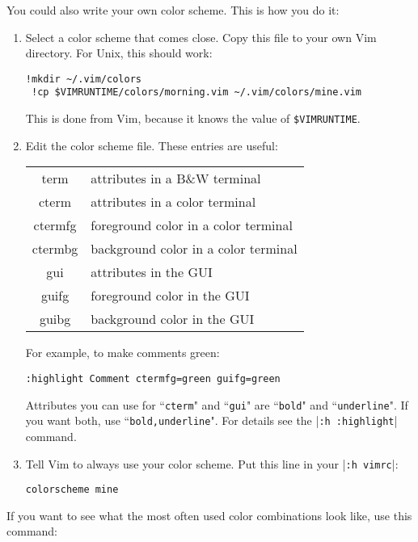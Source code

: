 You could also write your own color scheme.
This is how you do it:
\begin{enumerate}
				\item Select a color scheme that comes close.
								Copy this file to your own Vim directory.
								For Unix, this should work:

								\begin{Verbatim}[samepage=true]
 !mkdir ~/.vim/colors
 !cp $VIMRUNTIME/colors/morning.vim ~/.vim/colors/mine.vim
 \end{Verbatim}

								This is done from Vim, because it knows the value of \texttt{\$VIMRUNTIME}.

				\item Edit the color scheme file.
								These entries are useful:

								\begin{tabular}{c l}
												term & attributes in a B\&W terminal\\
												cterm & attributes in a color terminal\\
												ctermfg & foreground color in a color terminal\\
												ctermbg & background color in a color terminal\\
												gui & attributes in the GUI\\
												guifg & foreground color in the GUI\\
												guibg & background color in the GUI\\
								\end{tabular}

								For example, to make comments green:

								\begin{Verbatim}[samepage=true]
 :highlight Comment ctermfg=green guifg=green
								\end{Verbatim}

								Attributes you can use for ``\texttt{cterm}" and ``\texttt{gui}" are ``\texttt{bold}" and ``\texttt{underline}".
								If you want both, use ``\texttt{bold,underline}".
								For details see the |\texttt{:h :highlight}| command.

				\item Tell Vim to always use your color scheme.
								Put this line in your |\texttt{:h vimrc}|:

								\begin{Verbatim}[samepage=true]
 colorscheme mine
 \end{Verbatim}

\end{enumerate}
If you want to see what the most often used color combinations look like, use this command:

